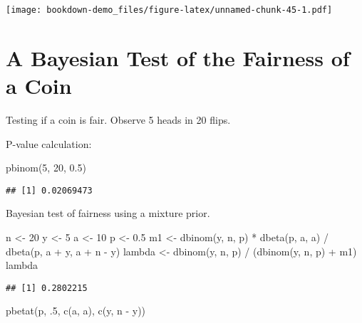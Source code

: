 \documentclass[
]{book}
\newenvironment{Shaded}{\begin{snugshade}}{\end{snugshade}}
\newcommand{\DecValTok}[1]{\textcolor[rgb]{0.00,0.00,0.81}{#1}}
\newcommand{\FloatTok}[1]{\textcolor[rgb]{0.00,0.00,0.81}{#1}}
\newcommand{\FunctionTok}[1]{\textcolor[rgb]{0.00,0.00,0.00}{#1}}
\newcommand{\NormalTok}[1]{#1}
\newcommand{\OtherTok}[1]{\textcolor[rgb]{0.56,0.35,0.01}{#1}}
\newcommand{\SpecialCharTok}[1]{\textcolor[rgb]{0.00,0.00,0.00}{#1}}
\begin{document}
\texttt{[image: bookdown-demo\_files/figure-latex/unnamed-chunk-45-1.pdf]}

\hypertarget{a-bayesian-test-of-the-fairness-of-a-coin}{%
\section{A Bayesian Test of the Fairness of a Coin}\label{a-bayesian-test-of-the-fairness-of-a-coin}}

Testing if a coin is fair. Observe 5 heads in 20 flips.

P-value calculation:

\begin{Shaded}
\begin{Highlighting}[]
\FunctionTok{pbinom}\NormalTok{(}\DecValTok{5}\NormalTok{, }\DecValTok{20}\NormalTok{, }\FloatTok{0.5}\NormalTok{)}
\end{Highlighting}
\end{Shaded}

\begin{verbatim}
## [1] 0.02069473
\end{verbatim}

Bayesian test of fairness using a mixture prior.

\begin{Shaded}
\begin{Highlighting}[]
\NormalTok{n }\OtherTok{\textless{}{-}} \DecValTok{20}
\NormalTok{y }\OtherTok{\textless{}{-}} \DecValTok{5}
\NormalTok{a }\OtherTok{\textless{}{-}} \DecValTok{10}
\NormalTok{p }\OtherTok{\textless{}{-}} \FloatTok{0.5}
\NormalTok{m1 }\OtherTok{\textless{}{-}} \FunctionTok{dbinom}\NormalTok{(y, n, p) }\SpecialCharTok{*} \FunctionTok{dbeta}\NormalTok{(p, a, a) }\SpecialCharTok{/} 
  \FunctionTok{dbeta}\NormalTok{(p, a }\SpecialCharTok{+}\NormalTok{ y, a }\SpecialCharTok{+}\NormalTok{ n }\SpecialCharTok{{-}}\NormalTok{ y)}
\NormalTok{lambda }\OtherTok{\textless{}{-}} \FunctionTok{dbinom}\NormalTok{(y, n, p) }\SpecialCharTok{/}\NormalTok{ (}\FunctionTok{dbinom}\NormalTok{(y, n, p) }\SpecialCharTok{+}\NormalTok{ m1)}
\NormalTok{lambda}
\end{Highlighting}
\end{Shaded}

\begin{verbatim}
## [1] 0.2802215
\end{verbatim}

\begin{Shaded}
\begin{Highlighting}[]
\FunctionTok{pbetat}\NormalTok{(p, .}\DecValTok{5}\NormalTok{, }\FunctionTok{c}\NormalTok{(a, a), }\FunctionTok{c}\NormalTok{(y, n }\SpecialCharTok{{-}}\NormalTok{ y))}
\end{Highlighting}
\end{Shaded}
\end{document}
